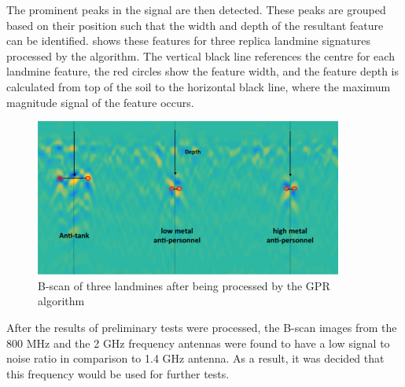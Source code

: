 \documentclass[main.tex]{subfiles}
\begin{document}
The prominent peaks in the signal are then detected. These peaks are grouped based on their position such that the width and depth of the resultant feature can be identified.  shows these features for three replica landmine signatures processed by the algorithm. The vertical black line references the centre for each landmine feature, the red circles show the feature width, and the feature depth is calculated from top of the soil to the horizontal black line, where the maximum magnitude signal of the feature occurs.

\begin{figure}[!ht]
\includegraphics[width=0.9\textwidth]{4-DetailedDesign/GPRalg.PNG}
\centering
\caption{B-scan of three landmines after being processed by the GPR algorithm}
\end{figure}


After the results of preliminary tests were processed, the B-scan images from the 800 MHz and the 2 GHz frequency antennas were found to have a low signal to noise ratio in comparison to 1.4 GHz antenna. As a result, it was decided that this frequency would be used for further tests.

\end{document}
